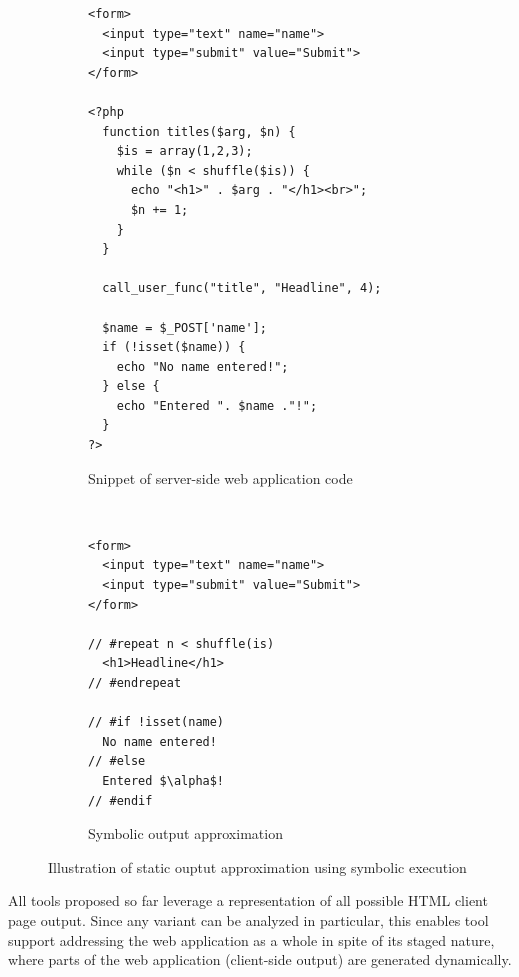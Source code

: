 \documentclass[preprint]{sig-alternate-05-2015}
\begin{document}
\begin{figure}
	\centering
	\begin{subfigure}[center]{0.49\textwidth}%
\begin{lstlisting}
<form>
  <input type="text" name="name">
  <input type="submit" value="Submit">
</form>

<?php
  function titles($arg, $n) {
    $is = array(1,2,3);
    while ($n < shuffle($is)) {
      echo "<h1>" . $arg . "</h1><br>";
      $n += 1;
    }
  }
  
  call_user_func("title", "Headline", 4);

  $name = $_POST['name'];
  if (!isset($name)) {
    echo "No name entered!";
  } else {
    echo "Entered ". $name ."!";
  }
?>
\end{lstlisting}
		\caption{Snippet of server-side web application code}
    \end{subfigure}
    ~ %
    \begin{subfigure}[center]{0.49\textwidth}
\begin{lstlisting}[mathescape]
<form>
  <input type="text" name="name">
  <input type="submit" value="Submit">
</form>

// #repeat n < shuffle(is)
  <h1>Headline</h1>
// #endrepeat

// #if !isset(name)
  No name entered!
// #else
  Entered $\alpha$!
// #endif

\end{lstlisting}
		\caption{Symbolic output approximation}
    \end{subfigure}
    \vspace{2mm}
    \caption{Illustration of static ouptut approximation using symbolic
    execution}
\end{figure}


All tools proposed so far leverage a representation of all possible HTML client page output. Since any variant can be analyzed in particular, this enables tool support addressing the web application as a whole in spite of its staged nature, where parts of the web application (client-side output) are generated dynamically.
\end{document}
